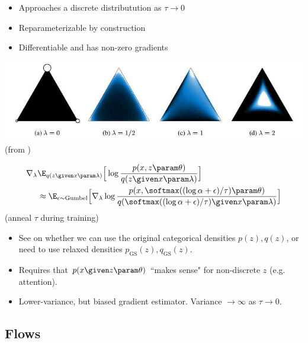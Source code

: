 \begin{frame}
\begin{itemize}
    \item Approaches a discrete distributution as $\tau \to 0$
    \item Reparameterizable by construction
    \item Differentiable and has non-zero gradients
\end{itemize}
\center
\includegraphics[scale=0.3]{pics/concrete.jpg} \\
(from \cite{Maddison2017})
\end{frame}

\begin{frame}
\vspace{-5mm}
\begin{align*} 
  \nabla_\lambda& \E_{q(z \given x \param \lambda)}\Big[ \log \frac{p(x, z \param \theta)}{q(z \given x \param \lambda)}\Big] \\ &\approx 
\E_{ \epsilon \sim \text{Gumbel}}\Big[\nabla_\lambda \log \frac{ p(x, \softmax((\log \alpha + \epsilon)/\tau) \param \theta)}{q(\softmax((\log \alpha + \epsilon)/\tau) \given x \param \lambda)}\Big] 
\end{align*}
(anneal $\tau$ during training)
\begin{itemize}
\item See \cite{Maddison2017} on whether we can use the original categorical densities $p(z), q(z)$, or need to use relaxed densities $p_{\text{GS}}(z), q_{\text{GS}}(z)$.
\item Requires that $p(x \given z \param \theta)$ ``makes sense" for non-discrete $z$ (e.g. attention).
    \item Lower-variance, but biased gradient estimator. Variance $\to \infty$ as $\tau \to 0$.
\end{itemize}
\end{frame}

\subsection{Flows}

